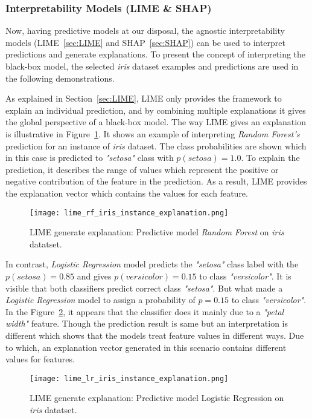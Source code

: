 \documentclass[english]{tktltiki2}
\theoremstyle{definition}
\theoremstyle{remark}
\begin{document}
\subsubsection{Interpretability Models (LIME \& SHAP)}
Now, having predictive models at our disposal, the agnostic interpretability models (LIME~\ref{sec:LIME} and SHAP~\ref{sec:SHAP}) can be used to interpret predictions and generate explanations. To present the concept of interpreting the black-box model, the selected \textit{iris} dataset examples and predictions are used in the following demonstrations.

As explained in Section~\ref{sec:LIME}, LIME only provides the framework to explain an individual prediction, and by combining multiple explanations it gives the global perspective of a black-box model. The way LIME gives an explanation is illustrative in Figure~\ref{fig:lime_rf_iris_instance_explanation}. It shows an example of interpreting \textit{Random Forest's} prediction for an instance of \textit{iris} dataset. The class probabilities are shown which in this case is predicted to \textit{"setosa"} class with $p(setosa)=1.0$. To explain the prediction, it describes the range of values which represent the positive or negative contribution of the feature in the prediction. As a result, LIME provides the explanation vector which contains the values for each feature.
\begin{figure}[H]
	\centering
	\vspace*{5mm}
	\texttt{[image: lime\_rf\_iris\_instance\_explanation.png]}
	\caption{LIME generate explanation: Predictive model \textit{Random Forest} on \textit{iris} datatset.}
	\label{fig:lime_rf_iris_instance_explanation}
\end{figure}

In contrast, \textit{Logistic Regression} model predicts the \textit{"setosa"} class label with the $p(setosa) = 0.85$ and gives $p(versicolor) = 0.15$ to class \textit{"versicolor"}. It is visible that both classifiers predict correct class \textit{"setosa"}. But what made a \textit{Logistic Regression} model to assign a probability of $p=0.15$ to class \textit{"versicolor"}. In the Figure~\ref{fig:lime_lr_iris_instance_explanation}, it appears that the classifier does it mainly due to a \textit{"petal width"} feature. Though the prediction result is same but an interpretation is different which shows that the models treat feature values in different ways. Due to which, an explanation vector generated in this scenario contains different values for features.
\begin{figure}[H]
	\centering
	\vspace*{5mm}
	\texttt{[image: lime\_lr\_iris\_instance\_explanation.png]}
	\caption{LIME generate explanation: Predictive model Logistic Regression on \textit{iris} datatset.}
	\label{fig:lime_lr_iris_instance_explanation}
\end{figure} 
\end{document}
